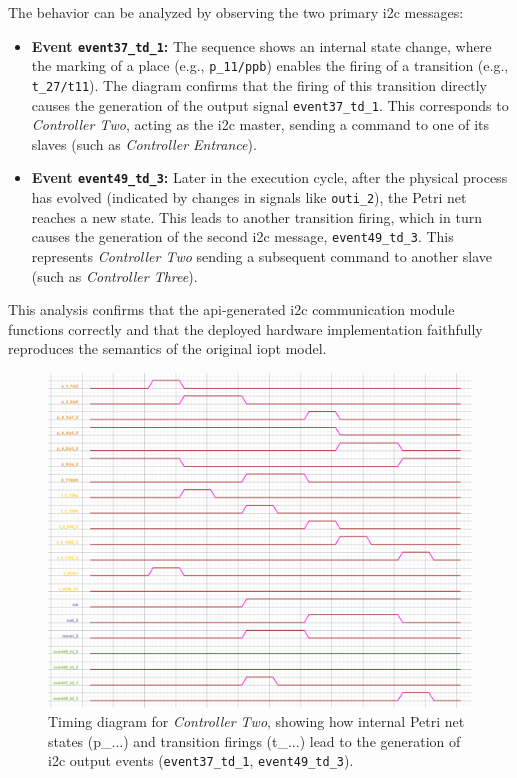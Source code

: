 The behavior can be analyzed by observing the two primary \gls{i2c} messages:
\begin{itemize}
    \item \textbf{Event \texttt{event37\_td\_1}:} The sequence shows an internal state change, where the marking of a place (e.g., \texttt{p\_11/ppb}) enables the firing of a transition (e.g., \texttt{t\_27/t11}). The diagram confirms that the firing of this transition directly causes the generation of the output signal \texttt{event37\_td\_1}. This corresponds to \textit{Controller Two}, acting as the \gls{i2c} master, sending a command to one of its slaves (such as \textit{Controller Entrance}).

    \item \textbf{Event \texttt{event49\_td\_3}:} Later in the execution cycle, after the physical process has evolved (indicated by changes in signals like \texttt{outi\_2}), the Petri net reaches a new state. This leads to another transition firing, which in turn causes the generation of the second \gls{i2c} message, \texttt{event49\_td\_3}. This represents \textit{Controller Two} sending a subsequent command to another slave (such as \textit{Controller Three}).
\end{itemize}

This analysis confirms that the \gls{api}-generated \gls{i2c} communication module functions correctly and that the deployed hardware implementation faithfully reproduces the semantics of the original \gls{iopt} model.


\begin{figure}[htb!]
    \centering
    \includegraphics[width=\columnwidth]{Chapters/Figures/timing_diagram_controller2.png}
    \caption{Timing diagram for \textit{Controller Two}, showing how internal Petri net states (p\_...) and transition firings (t\_...) lead to the generation of \gls{i2c} output events (\texttt{event37\_td\_1}, \texttt{event49\_td\_3}).}
    \label{fig:timing_diagram_controller2}
\end{figure}


